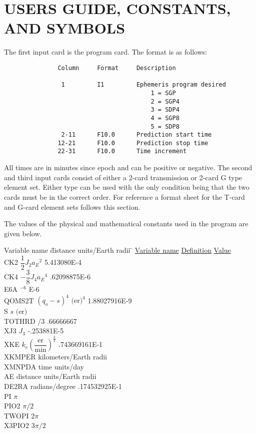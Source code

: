 \section[Users Guide, Constants, and Symbols]{USERS GUIDE, CONSTANTS, AND SYMBOLS}
The first input card is the program card.  The format is as follows:

\begin{verbatim}
               Column     Format     Description

                1         I1         Ephemeris program desired
                                         1 = SGP
                                         2 = SGP4
                                         3 = SDP4
                                         4 = SGP8
                                         5 = SDP8
                2-11      F10.0      Prediction start time
               12-21      F10.0      Prediction stop time
               22-31      F10.0      Time increment
\end{verbatim}

\noindent
All times are in minutes since epoch and can be positive or negative.  The
second and third input cards consist of either a 2-card transmission or 2-card
G type element set.  Either type can be used with the only condition being
that the two cards must be in the correct order.  For reference a format sheet
for the T-card and G-card element sets follows this section.

The values of the physical and mathematical constants used in the program are
given below.

\begin{tabbing}
Variable name \quad \= distance units/Earth radii \quad \= \kill
\underline{Variable name} \> \underline{Definition} \> \underline{Value}\\[12pt]
CK2 \> $\dfrac12J_2a_E{}^2$ \> 5.413080E-4\\[12pt]
CK4 \> $-\dfrac38J_4a_E{}^4$ \> .62098875E-6\\[12pt]
E6A $^{-6}$  E-6\\[12pt]
QOMS2T \> $(q_o-s)^4\mbox{ (er)}^4$ \> 1.88027916E-9\\[12pt]
S \> $s\mbox{ (er)}$ \\[12pt]
TOTHRD /3 \> .66666667\\[12pt]
XJ3 \> $J_3$ \> -.253881E-5\\[12pt]
XKE \> $k_e\left(\dfrac{\mbox{er}}{\mbox{min}}\right)^{\frac32}$ \> .743669161E-1\\[12pt]
XKMPER \> kilometers/Earth radii \\[12pt]
XMNPDA \> time units/day \\[12pt]
AE \> distance units/Earth radii \\[12pt]
DE2RA \> radians/degree \> .174532925E-1\\[12pt]
PI \> $\pi$ \\[12pt]
PIO2 \> $\pi/2$ \\[12pt]
TWOPI \> $2\pi$ \\[12pt]
X3PIO2 \> $3\pi/2$ 
\end{tabbing}

